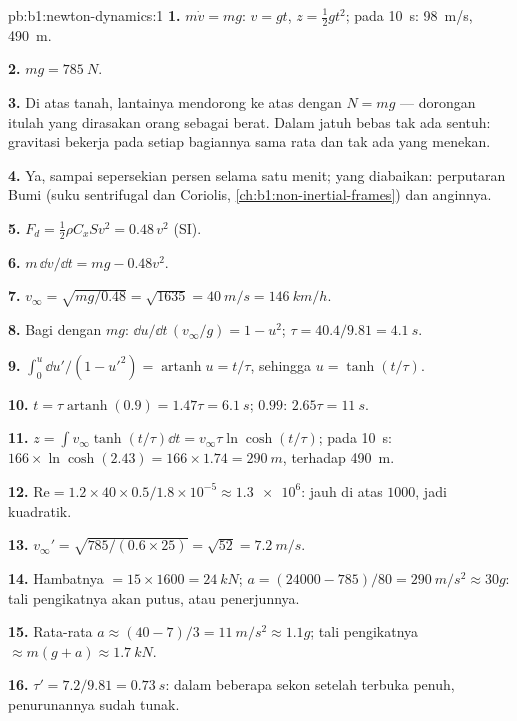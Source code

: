 \begin{solution}{pb:b1:newton-dynamics:1}
\textbf{1.} $m\dot v = mg$: $v = gt$, $z = \tfrac12 gt^2$; pada \qty{10}{s}:
\qty{98}{m/s}, \qty{490}{m}.

\textbf{2.} $mg = \qty{785}{N}$.

\textbf{3.} Di atas tanah, lantainya mendorong ke atas dengan $N = mg$
--- dorongan itulah yang dirasakan orang sebagai berat. Dalam jatuh
bebas tak ada  sentuh: gravitasi bekerja pada setiap bagiannya sama
rata dan tak ada yang menekan.

\textbf{4.} Ya, sampai sepersekian persen selama satu menit; yang
diabaikan: perputaran Bumi (suku sentrifugal dan Coriolis,
\cref{ch:b1:non-inertial-frames}) dan anginnya.

\textbf{5.} $F_d = \tfrac12\rho C_xSv^2 = 0.48\,v^2$ (SI).

\textbf{6.} $m\,\dd v/\dd t = mg - 0.48v^2$.

\textbf{7.} $v_\infty = \sqrt{mg/0.48} = \sqrt{1635} = \qty{40}{m/s} =
\qty{146}{km/h}$.

\textbf{8.} Bagi dengan $mg$: $\dd u/\dd t\,(v_\infty/g) = 1 - u^2$;
$\tau = 40.4/9.81 = \qty{4.1}{s}$.

\textbf{9.} $\int_0^u\dd u'/(1 - u'^2) = \operatorname{artanh}u = t/\tau$,
sehingga $u = \tanh(t/\tau)$.

\textbf{10.} $t = \tau\operatorname{artanh}(0.9) = 1.47\tau = \qty{6.1}{s}$;
$0.99$: $2.65\tau = \qty{11}{s}$.

\textbf{11.} $z = \int v_\infty\tanh(t/\tau)\dd t = v_\infty\tau\ln\cosh(t/\tau)$;
pada \qty{10}{s}: $166 \times \ln\cosh(2.43) = 166 \times 1.74 = \qty{290}{m}$,
terhadap \qty{490}{m}.

\textbf{12.} $\mathrm{Re} = 1.2 \times 40 \times 0.5/1.8\times10^{-5} \approx
\num{1.3e6}$: jauh di atas $1000$, jadi kuadratik.

\textbf{13.} $v_\infty' = \sqrt{785/(0.6 \times 25)} = \sqrt{52} = \qty{7.2}{m/s}$.

\textbf{14.} Hambatnya $= 15 \times 1600 = \qty{24}{kN}$; $a = (24000 - 785)/80
= \qty{290}{m/s^2} \approx 30g$: tali pengikatnya akan putus, atau penerjunnya.

\textbf{15.} Rata-rata $a \approx (40 - 7)/3 = \qty{11}{m/s^2} \approx 1.1g$;
 tali pengikatnya $\approx m(g + a) \approx \qty{1.7}{kN}$.

\textbf{16.} $\tau' = 7.2/9.81 = \qty{0.73}{s}$: dalam beberapa sekon
setelah terbuka penuh, penurunannya sudah tunak.


\end{solution}

